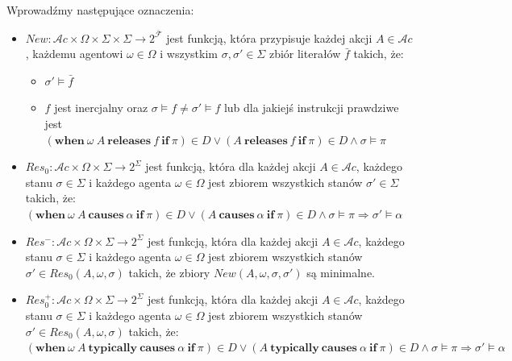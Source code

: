 \documentclass[11pt,a4paper]{article}
\begin{document}
    Wprowadźmy następujące oznaczenia:
    \begin{itemize}
        \item $New: \mathcal{A}c \times \Omega \times \Sigma \times \Sigma \rightarrow 2^{\bar{\mathcal{F}}}$ jest funkcją, która przypisuje każdej akcji $A \in \mathcal{A}c$, każdemu agentowi $\omega \in \Omega$ i wszystkim $\sigma, \sigma' \in \Sigma$ zbiór literałów $\bar{f}$ takich, że:
        \begin{itemize}
            \item $\sigma' \models \bar{f}$
            \item $f$ jest inercjalny oraz $\sigma \models f \neq \sigma' \models f$ lub
            dla jakiejś instrukcji prawdziwe jest\\$(\mathbf{when}~\omega~A~\mathbf{releases}~f~\mathbf{if}~\pi) \in D \vee (A~\mathbf{releases}~f~\mathbf{if}~\pi) \in D \wedge \sigma \models \pi$
        \end{itemize}
        
        \item $Res_0: \mathcal{A}c \times \Omega \times \Sigma \rightarrow 2^\Sigma$ jest funkcją, która dla każdej akcji $A \in \mathcal{A}c$, każdego stanu $\sigma \in \Sigma$ i każdego agenta $\omega \in \Omega$ jest zbiorem wszystkich stanów $\sigma' \in \Sigma$ takich, że:\\
        $(\mathbf{when}~\omega~A~\mathbf{causes}~\alpha~\mathbf{if}~\pi) \in D \vee (A~\mathbf{causes}~\alpha~\mathbf{if}~\pi) \in D \wedge \sigma \models \pi \Rightarrow \sigma' \models \alpha$

        \item $Res^-: \mathcal{A}c \times \Omega \times \Sigma \rightarrow 2^\Sigma$ jest funkcją, która dla każdej akcji $A \in \mathcal{A}c$, każdego stanu $\sigma \in \Sigma$ i każdego agenta $\omega \in \Omega$ jest zbiorem wszystkich stanów $\sigma' \in Res_0(A, \omega, \sigma)$ takich, że zbiory $New(A, \omega, \sigma, \sigma')$ są minimalne.
        
        \item $Res_0^+: \mathcal{A}c \times \Omega \times \Sigma \rightarrow 2^\Sigma$ jest funkcją, która dla każdej akcji $A \in \mathcal{A}c$, każdego stanu $\sigma \in \Sigma$ i każdego agenta $\omega \in \Omega$ jest zbiorem wszystkich stanów $\sigma' \in Res_0(A, \omega, \sigma)$ takich, że:\\
        $(\mathbf{when}~\omega~A~\mathbf{typically~causes}~\alpha~\mathbf{if}~\pi) \in D \vee (A~\mathbf{typically~causes}~\alpha~\mathbf{if}~\pi) \in D \wedge \sigma \models \pi \Rightarrow \sigma' \models \alpha$
    \end{itemize}
    
\end{document}
